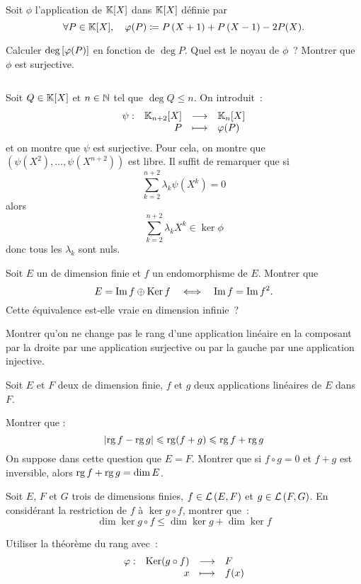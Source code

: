 \documentclass{magnolia}
\begin{document}
Soit $\phi$ l'application de $\polyK$ dans $\polyK$ définie par
\[\forall P\in\polyK \qsep \phi(P)\defeq P\p{X+1}+P\p{X-1}-2P(X).\]
\begin{questions}
\question Calculer $\deg\left[\varphi(P)\right]$ en fonction de $\deg P$.
\question Quel est le noyau de $\phi$~?
\question Montrer que $\phi$ est surjective.
\end{questions}
\begin{sol}
$\quad$
\begin{questions}
\question
\question
\question Soit $Q\in\polyK$ et $n\in\mathbb{N}$ tel que $\deg Q\leq n$. On
  introduit~:
  \[\dspappli{\psi}{\polyK[n+2]}{\polyK[n]}{P}{\phi(P)}\]
  et on montre que $\psi$ est surjective. Pour cela, on montre que
  $(\psi(X^2),\ldots,\psi(X^{n+2}))$ est libre. Il suffit de remarquer
  que si
  \[\sum_{k=2}^{n+2} \lambda_k \psi(X^k)=0\]
  alors
  \[\sum_{k=2}^{n+2} \lambda_k X^k\in\ker\phi\]
  donc tous les $\lambda_k$ sont nuls.
\end{questions}
\end{sol}


Soit $E$ un \Kev de dimension finie et $f$ un endomorphisme de $E$. Montrer
que
\[E=\operatorname{Im} f \oplus \mathop{\rm Ker} f  \quad\Longleftrightarrow\quad
 \operatorname{Im} f = \operatorname{Im} f^2.\]
Cette équivalence est-elle vraie en dimension infinie~?


Montrer qu'on ne change pas le rang d'une application linéaire en la composant par
la droite par une application surjective ou par la gauche par une application injective.  

Soit $E$ et $F$ deux \Kev de dimension finie, $f$ et $g$ deux applications
linéaires de $E$ dans $F$.
\begin{questions}
\question Montrer que :
  \[\left|\operatorname{rg} f-\operatorname{rg} g\right| \leqslant \operatorname{rg} (f+g) \leqslant \operatorname{rg} f+\operatorname{rg} g\]
\question On suppose dans cette question que $E=F$. Montrer que si
  $f\circ g=0$ et $f+g$ est inversible, alors $\operatorname{rg} f+\operatorname{rg} g=\dim E$.
\end{questions}

Soit $E$, $F$ et $G$ trois \Kevs de dimensions finies, $f\in\mathcal{L}\left(E,F\right)$ et
$g\in\mathcal{L}\left(F,G\right)$. En considérant la restriction de $f$ à
$\ker g\circ f$, montrer que~:
\[\dim \ker g\circ f \leq \dim \ker g + \dim \ker f\]
\begin{sol}
Utiliser la théorème du rang avec~:
\[\begin{array}[t]{lrcl} \displaystyle{\varphi} : & \displaystyle{\mathop{\rm Ker}(g\circ f)} & \longrightarrow & \displaystyle{F} \\ & \displaystyle{x} & \longmapsto & \displaystyle{f(x)} \end{array}\]
\end{sol}
\end{document}
